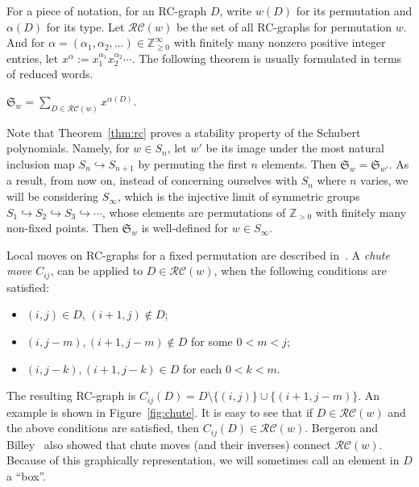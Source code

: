 \documentclass[10pt]{amsart}
\newcommand{\Z}{\mathbb{Z}}
\newcommand{\RC}{\mathcal{RC}}
\begin{document}
For a piece of notation, for an RC-graph $D$, write $w(D)$ for its permutation and $\alpha(D)$ for its type. Let $\RC(w)$ be the set of all RC-graphs for permutation $w$. And for $\alpha=(\alpha_1,\alpha_2,\ldots)\in\Z_{\geq0}^{\infty}$ with finitely many nonzero positive integer entries, let $x^{\alpha}:=x_1^{\alpha_1}x_2^{\alpha_2}\cdots.$ The following theorem is usually formulated in terms of reduced words.
\begin{theorem}\label{thm:rc}
$\mathfrak{S}_w=\sum_{D\in\RC(w)}x^{\alpha(D)}.$
\end{theorem}
Note that Theorem~\ref{thm:rc} proves a stability property of the Schubert polynomials. Namely, for $w\in S_n$, let $w'$ be its image under the most natural inclusion map $S_n\hookrightarrow S_{n+1}$ by permuting the first $n$ elements. Then $\mathfrak{S}_w=\mathfrak{S}_{w'}$. As a result, from now on, instead of concerning ourselves with $S_n$ where $n$ varies, we will be considering $S_{\infty}$, which is the injective limit of symmetric groups $S_1\hookrightarrow S_2\hookrightarrow S_3\hookrightarrow\cdots$, whose elements are permutations of $\Z_{>0}$ with finitely many non-fixed points. Then $\mathfrak{S}_w$ is well-defined for $w\in S_{\infty}$. 

Local moves on RC-graphs for a fixed permutation are described in~\cite{bergeron1993rc}. A \emph{chute move} $C_{ij}$, can be applied to $D\in\RC(w)$, when the following conditions are satisfied:
\begin{itemize}
\item $(i,j)\in D$, $(i+1,j)\notin D$;
\item $(i,j-m),(i+1,j-m)\notin D$ for some $0<m<j$;
\item $(i,j-k),(i+1,j-k)\in D$ for each $0<k<m$.
\end{itemize}
The resulting RC-graph is $C_{ij}(D)=D\setminus\{(i,j)\}\cup\{(i+1,j-m)\}.$ An example is shown in Figure~\ref{fig:chute}. It is easy to see that if $D\in\RC(w)$ and the above conditions are satisfied, then $C_{ij}(D)\in\RC(w)$. Bergeron and Billey~\cite{bergeron1993rc} also showed that chute moves (and their inverses) connect $\RC(w)$. 
Because of this graphically representation, we will sometimes call an element in $D$ a ``box''. 
\end{document}
